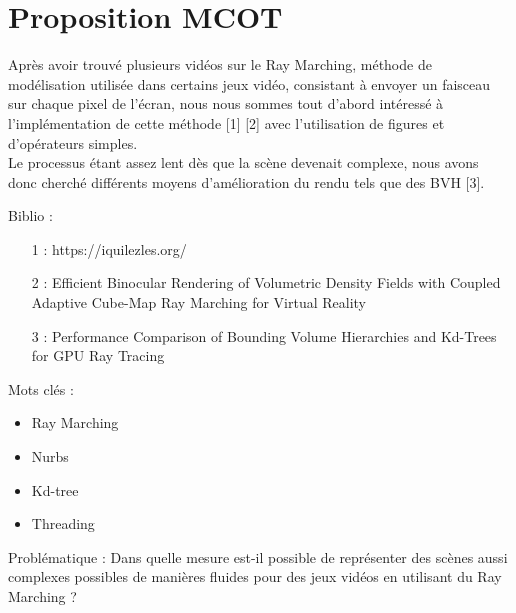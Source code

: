\documentclass{article}
\begin{document}
\section{Proposition MCOT}



Après avoir trouvé plusieurs vidéos sur le Ray Marching, méthode de 
modélisation utilisée dans certains jeux vidéo, consistant à envoyer un faisceau sur chaque pixel de l'écran,
nous nous sommes tout d'abord intéressé à l'implémentation de cette méthode [1] [2]
avec l'utilisation de figures et d'opérateurs simples.\\
Le processus étant assez lent dès que la scène devenait complexe, nous avons donc
cherché différents moyens d'amélioration du rendu tels que des BVH [3].
\smallskip 

Biblio : 
\begin{itemize}
    \item [1] : https://iquilezles.org/
    \item [2] : Efficient Binocular Rendering of Volumetric Density Fields with Coupled Adaptive Cube-Map Ray Marching for Virtual Reality
    \item [3] : Performance Comparison of Bounding Volume Hierarchies and Kd-Trees for GPU Ray Tracing
\end{itemize}
\smallskip 

Mots clés : 
\begin{itemize}
    \item Ray Marching
    \item Nurbs
    \item Kd-tree
    \item Threading
\end{itemize}
\medskip


Problématique : 
Dans quelle mesure est-il possible de représenter des scènes aussi complexes possibles de manières fluides 
pour des jeux vidéos en utilisant du Ray Marching ?
\end{document}
